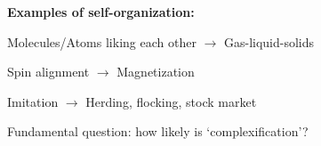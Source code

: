 \begin{frame}[plain]
\begin{frame}[plain]
  



    \textbf{Examples of self-organization:}

   
     
     
       Molecules/Atoms liking each other $\rightarrow$ Gas-liquid-solids
     
       Spin alignment $\rightarrow$ Magnetization
      
       Imitation $\rightarrow$ Herding, flocking, stock market
     

     \medskip

     {
       Fundamental question: how likely is `complexification'?
     }
   

 

\end{frame}
\end{frame}
